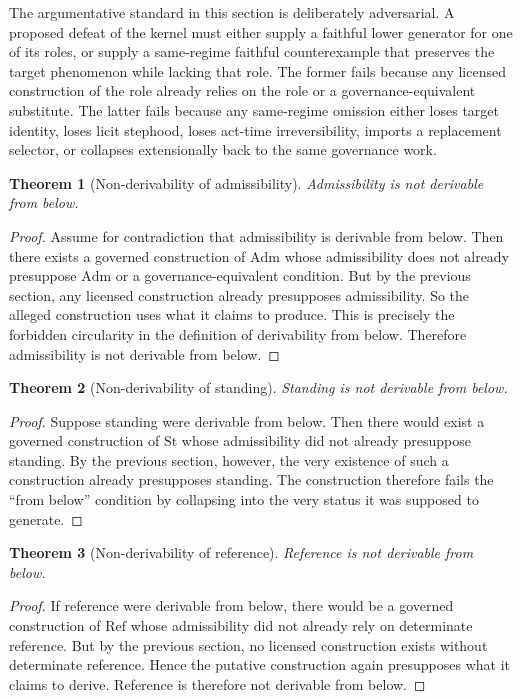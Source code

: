 \documentclass[11pt]{article}
\newtheorem{theorem}{Theorem}[section]
\theoremstyle{definition}
\theoremstyle{remark}
\newcommand{\Adm}{\mathrm{Adm}}
\newcommand{\St}{\mathrm{St}}
\newcommand{\RefK}{\mathrm{Ref}}
\begin{document}
The argumentative standard in this section is deliberately adversarial. A proposed defeat of the kernel must either supply a faithful lower generator for one of its roles, or supply a same-regime faithful counterexample that preserves the target phenomenon while lacking that role. The former fails because any licensed construction of the role already relies on the role or a governance-equivalent substitute. The latter fails because any same-regime omission either loses target identity, loses licit stephood, loses act-time irreversibility, imports a replacement selector, or collapses extensionally back to the same governance work.

\begin{theorem}[Non-derivability of admissibility]
Admissibility is not derivable from below.
\end{theorem}

\begin{proof}
Assume for contradiction that admissibility is derivable from below. Then there exists a governed construction of $\Adm$ whose admissibility does not already presuppose $\Adm$ or a governance-equivalent condition. But by the previous section, any licensed construction already presupposes admissibility. So the alleged construction uses what it claims to produce. This is precisely the forbidden circularity in the definition of derivability from below. Therefore admissibility is not derivable from below.
\end{proof}

\begin{theorem}[Non-derivability of standing]
Standing is not derivable from below.
\end{theorem}

\begin{proof}
Suppose standing were derivable from below. Then there would exist a governed construction of $\St$ whose admissibility did not already presuppose standing. By the previous section, however, the very existence of such a construction already presupposes standing. The construction therefore fails the ``from below'' condition by collapsing into the very status it was supposed to generate.
\end{proof}

\begin{theorem}[Non-derivability of reference]
Reference is not derivable from below.
\end{theorem}

\begin{proof}
If reference were derivable from below, there would be a governed construction of $\RefK$ whose admissibility did not already rely on determinate reference. But by the previous section, no licensed construction exists without determinate reference. Hence the putative construction again presupposes what it claims to derive. Reference is therefore not derivable from below.
\end{proof}
\end{document}
